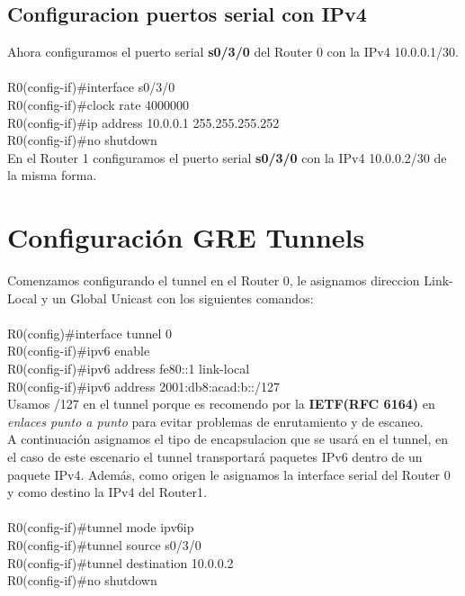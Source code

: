 \documentclass[a4paper,12pt]{article}
\begin{document}
\subsection{Configuracion puertos serial con IPv4}
Ahora configuramos el puerto serial \textbf{s0/3/0} del Router 0 con la IPv4 10.0.0.1/30.\\

\noindent\\
R0(config-if)\#interface s0/3/0\\
R0(config-if)\#clock rate 4000000\\
R0(config-if)\#ip address 10.0.0.1 255.255.255.252\\
R0(config-if)\#no shutdown\\

En el Router 1 configuramos el puerto serial \textbf{s0/3/0} con la IPv4 10.0.0.2/30 de la misma forma.\\

\section{Configuración GRE Tunnels}
Comenzamos configurando el tunnel en el Router 0, le asignamos direccion Link-Local y un Global Unicast con los siguientes comandos:\\
\noindent\\
R0(config)\#interface tunnel 0\\
R0(config-if)\#ipv6 enable\\
R0(config-if)\#ipv6 address fe80::1 link-local\\
R0(config-if)\#ipv6 address 2001:db8:acad:b::/127\\

Usamos /127 en el tunnel porque es recomendo por la \textbf{IETF(RFC 6164)} en \textit{enlaces punto a punto} para evitar problemas de enrutamiento y de escaneo.\\
A continuación asignamos el tipo de encapsulacion que se usará en el tunnel, en el caso de este escenario el tunnel transportará paquetes IPv6 dentro de un paquete IPv4. Además, como origen le asignamos la interface serial del Router 0 y como destino la IPv4 del Router1.\\

\noindent\\
R0(config-if)\#tunnel mode ipv6ip\\
R0(config-if)\#tunnel source s0/3/0\\
R0(config-if)\#tunnel destination 10.0.0.2\\
R0(config-if)\#no shutdown\\
\end{document}
